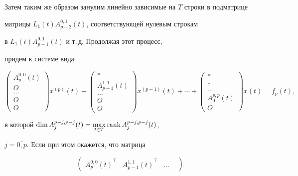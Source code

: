 \begin{pf}
Затем таким же образом занулим линейно зависимые на $T$ строки в подматрице 


матрицы $L_1(t)A_{p-2}^{0,1}(t)$, соответствующей нулевым строкам


в $L_1(t) A_{p-1}^{0,1}(t)$ и т.\,д. Продолжая этот процесс, 


придем к системе вида


\begin{equation}


\begin{pmatrix}


A_p^{0,0}(t) \\ O \\ \dotsc \\ O \\ O 


\end{pmatrix}x^{(p)}(t)+


\begin{pmatrix}


\ast \\ A_{p-1}^{1,1}(t) \\ \dotsc \\ O \\ O 


\end{pmatrix} x^{(p-1)}(t)+ \dotsb +


\begin{pmatrix}


\ast \\ \ast \\ \dotsc \\ A_{0}^{p,p}(t) \\ O 


\end{pmatrix} 


x(t)= f_p(t),


\end{equation}


в которой $\dim A_j^{p-j,p-j}(t)= \max\limits_{t \in T}


\rank A_j^{p-j,p-j}(t)$,


$j= \overline{0,p}$. Если при этом окажется, что матрица


\begin{equation}


\begin{pmatrix}


{A_p^{0,0}(t)}^\top &


{A_{p-1}^{1,1}(t)}^\top & \dotsc &



\end{pmatrix}
\end{equation}
\end{pf}
